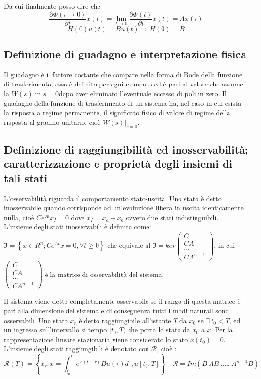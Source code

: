 \documentclass{article}
\begin{document}
Da cui finalmente posso dire che 
\[ \frac{\partial \Phi(t\to 0)}{\partial t}x(t) =\lim_{t\to 0}\frac{\partial \Phi(t)}{\partial t}x(t) = Ax(t) \]
\[ H(0)u(t) = Bu(t) \Rightarrow H(0) = B \]


\subsection{Definizione di guadagno e interpretazione fisica}
Il guadagno è il fattore costante che compare nella forma di Bode della funzione di trasferimento,
esso è definito per ogni elemento ed è pari al valore che assume la $W(s)$
in $s=0 $dopo aver eliminato l'eventuale eccesso di poli in zero.
Il guadagno della funzione di trasferimento di un sistema ha,
nel caso in cui esista la risposta a regime permanente,
il significato fisico di valore di regime della risposta al gradino unitario,
cioè $W(s)|_{s=0}$.


\subsection{Definizione di raggiungibilità ed inosservabilità; caratterizzazione e proprietà degli insiemi di tali stati}
L'osservabilità riguarda il comportamento stato-uscita.
Uno stato è detto inosservabile quando corrisponde ad un'evoluzione libera in uscita identicamente nulla,
cioè $Ce^{At}x_I=0$ dove $x_I=x_a-x_b$ ovvero due stati indistinguibili.
L'insieme degli stati inosservabili è definito come:
$\mathfrak{I} =\left\{ x \in R^n ; Ce^{At}x=0 , \forall t \geq 0 \right\}$ che equivale al 
$\mathfrak{I}=ker \begin{pmatrix}C\\CA\\...\\CA^{n-1}\end{pmatrix}$,
in cui $\begin{pmatrix}C\\CA\\...\\CA^{n-1}\end{pmatrix}$ è la matrice di osservabilità del sistema.

Il sistema viene detto completamente osservabile se il rango di questa matrice è pari alla dimensione del sistema
e di conseguenza tutti i modi naturali sono osservabili.
Uno stato $x_r$ è detto raggiungibile all'istante $T$ da $x_0$ se $\exists\ t_0<T$, ed un ingresso sull'intervallo si tempo $[t_0,T)$
che porta lo stato da $x_0$ a $x$.
Per la rappresentazione lineare stazionaria viene considerato lo stato $x(t_0)=0$. 
L'insieme degli stati raggiungibili è denotato con $\mathcal{R}$, cioè :
\[ \mathcal{R}(T)=\left\{x_r : x=\int_{t_0}^{t}e^{A(t-\tau)}Bu(\tau)d\tau, u[t_0,T]\right\}
\quad \mathcal{R}=
Im(B\ AB\ .....\ A^{n-1}B)\]
\end{document}
